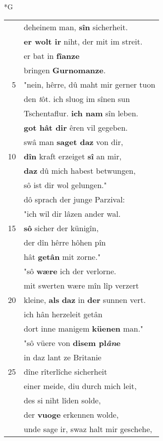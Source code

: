 \documentclass[8pt,a4paper,notitlepage]{article}
\begin{document}
\newpage
\begin{table}[ht]
\begin{minipage}[t]{0.5\linewidth}
\small
\begin{center}*G
\end{center}
\begin{tabular}{rl}
 & deheinem man, \textbf{sîn} sicherheit.\\ 
 & \textbf{er wolt ir} niht, der mit im streit.\\ 
 & er bat in \textbf{fîanze}\\ 
 & bringen \textbf{Gurnomanze}.\\ 
5 & "nein, hêrre, dû maht mir gerner tuon\\ 
 & den \textit{t}ôt. ich sluog im sînen sun\\ 
 & Tschentaflur. \textbf{ich nam} sîn leben.\\ 
 & \textbf{got hât dir} êren vil gegeben.\\ 
 & swâ man \textbf{saget daz} von dir,\\ 
10 & \textbf{dîn} kraft erzeiget \textbf{sî} an mir,\\ 
 & \textbf{daz} dû mich habest betwungen,\\ 
 & sô ist dir wol gelungen."\\ 
 & dô sprach der junge Parzival:\\ 
 & "ich wil dir lâzen ander wal.\\ 
15 & \textbf{sô} sicher der künigîn,\\ 
 & der dîn hêrre hôhen pîn\\ 
 & hât \textbf{getân} mit zorne."\\ 
 & "sô \textbf{wære} ich der verlorne.\\ 
 & mit swerten wære mîn lîp verzert\\ 
20 & kleine, \textbf{als} \textbf{daz} in \textbf{der} sunnen vert.\\ 
 & ich hân herzeleit getân\\ 
 & dort inne manigem \textbf{küenen} man."\\ 
 & "sô vüere von \textbf{disem pl\textit{ân}e}\\ 
 & in daz lant ze Britanie\\ 
25 & dîne rîterlîche sicherheit\\ 
 & einer meide, diu durch mich leit,\\ 
 & des si niht lîden solde,\\ 
 & der \textbf{vuoge} erkennen wolde,\\ 
 & unde sage ir, swaz halt mir geschehe,\\ 

\end{tabular}
\end{minipage}
\end{table}
\end{document}
